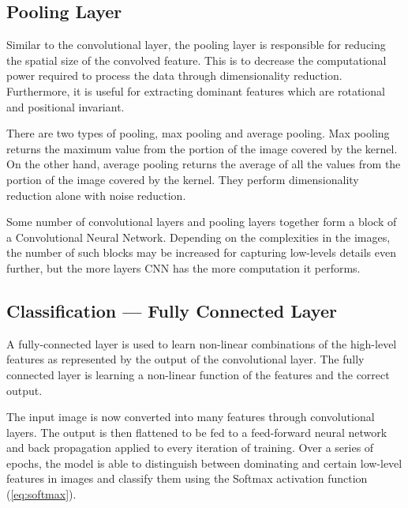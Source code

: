 \subsection{Pooling Layer}

Similar to the convolutional layer, the pooling layer is responsible for reducing the spatial size of the convolved feature. This is to decrease the computational power required to process the data through dimensionality reduction. Furthermore, it is useful for extracting dominant features which are rotational and positional invariant.

There are two types of pooling, max pooling and average pooling. Max pooling returns the maximum value from the portion of the image covered by the kernel. On the other hand, average pooling returns the average of all the values from the portion of the image covered by the kernel. They perform dimensionality reduction alone with noise reduction.

Some number of convolutional layers and pooling layers together form a block of a Convolutional Neural Network. Depending on the complexities in the images, the number of such blocks may be increased for capturing low-levels details even further, but the more layers CNN has the more computation it performs.

\subsection{Classification — Fully Connected Layer}

A fully-connected layer is used to learn non-linear combinations of the high-level features as represented by the output of the convolutional layer. The fully connected layer is learning a non-linear function of the features and the correct output.

The input image is now converted into many features through convolutional layers. The output is then flattened to be fed to a feed-forward neural network and back propagation applied to every iteration of training. Over a series of epochs, the model is able to distinguish between dominating and certain low-level features in images and classify them using the Softmax activation function (\ref{eq:softmax}).

